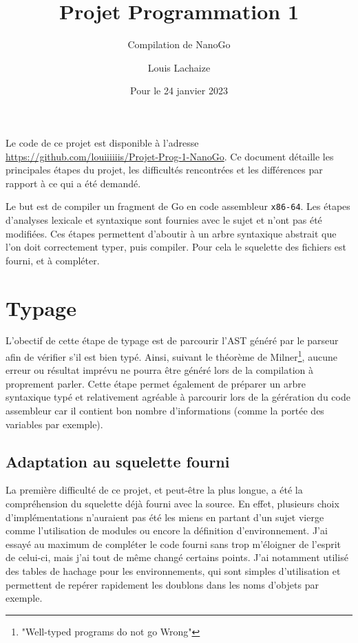 \documentclass{scrartcl}
\title{Projet Programmation 1}
\subtitle{Compilation de NanoGo}
\author{Louis Lachaize}
\date{Pour le 24 janvier 2023}
\begin{document}
\maketitle

Le code de ce projet est disponible à l'adresse \url{https://github.com/louiiiiiis/Projet-Prog-1-NanoGo}. Ce document détaille les principales étapes du projet, les difficultés rencontrées et les différences par rapport à ce qui a été demandé.\medskip

Le but est de compiler un fragment de Go en code assembleur \texttt{x86-64}. Les étapes d'analyses lexicale et syntaxique sont fournies avec le sujet et n'ont pas été modifiées. Ces étapes permettent d'aboutir à un arbre syntaxique abstrait que l'on doit correctement typer, puis compiler. Pour cela le squelette des fichiers est fourni, et à compléter.



\section{Typage}

L'obectif de cette étape de typage est de parcourir l'AST généré par le parseur afin de vérifier s'il est bien typé. Ainsi, suivant le théorème de Milner\footnote{"Well-typed programs do not go Wrong"}, aucune erreur ou résultat imprévu ne pourra être généré lors de la compilation à proprement parler. Cette étape permet également de préparer un arbre syntaxique typé et relativement agréable à parcourir lors de la gérération du code assembleur car il contient bon nombre d'informations (comme la portée des variables par exemple).


\subsection{Adaptation au squelette fourni}

La première difficulté de ce projet, et peut-être la plus longue, a été la compréhension du squelette déjà fourni avec la source. En effet, plusieurs choix d'implémentations n'auraient pas été les miens en partant d'un sujet vierge comme l'utilisation de modules ou encore la définition d'environnement. J'ai essayé au maximum de compléter le code fourni sans trop m'éloigner de l'esprit de celui-ci, mais j'ai tout de même changé certains points. J'ai notamment utilisé des tables de hachage pour les environnements, qui sont simples d'utilisation et permettent de repérer rapidement les doublons dans les noms d'objets par exemple.
\end{document}
